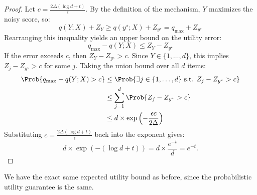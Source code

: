 \documentclass[11pt, a4paper]{article}
\begin{document}
\begin{proof}
Let $c = \frac{2\Delta(\log d + t)}{\epsilon}$. By the definition of the mechanism, $Y$ maximizes the noisy score, so:
\[
q(Y;X) + Z_Y \ge q(y^\star;X) + Z_{y^\star} = q_{\max} + Z_{y^\star}
\]
Rearranging this inequality yields an upper bound on the utility error:
\[
q_{\max} - q(Y;X) \le Z_Y - Z_{y^\star}
\]
If the error exceeds $c$, then $Z_Y - Z_{y^\star} > c$. Since $Y \in \{1, \dots, d\}$, this implies $Z_j - Z_{y^\star} > c$ for some $j$. Taking the union bound over all $d$ items:
\begin{align*}
\Prob{q_{\max} - q(Y;X) > c} &\le \Prob{\exists j \in \{1, \dots, d\} \text{ s.t. } Z_j - Z_{y^\star} > c} \\
&\le \sum_{j=1}^d \Prob{Z_j - Z_{y^\star} > c} \\
&\le d \times \exp\left(-\frac{\epsilon c}{2\Delta}\right)
\end{align*}
Substituting $c = \frac{2\Delta(\log d + t)}{\epsilon}$ back into the exponent gives:
\[
d \times \exp(-(\log d + t)) = d \times \frac{e^{-t}}{d} = e^{-t}.
\]
\end{proof}


We have the exact same expected utility bound as before, since the probabilistic utility guarantee is the same.
\end{document}

